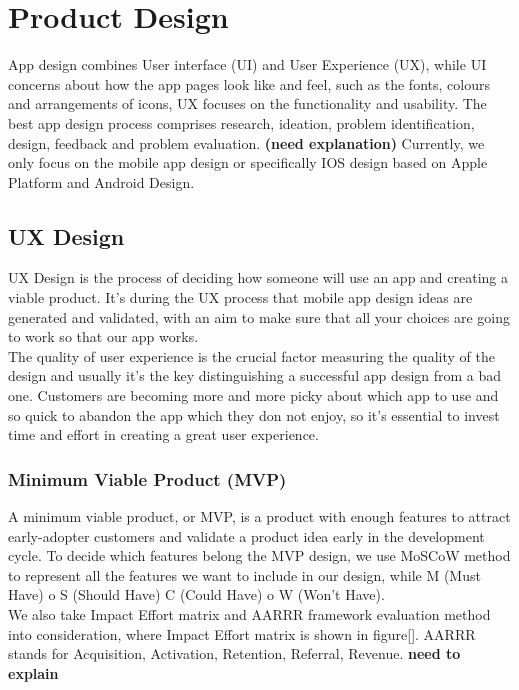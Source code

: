 
\chapter{Product Design} %

\label{Chapter2} %

App design combines User interface (UI) and User Experience (UX), while UI concerns about how the app pages look like and feel, such as the fonts, colours and arrangements of icons, UX focuses on the functionality and usability. The best app design process comprises research, ideation, problem identification, design, feedback and problem evaluation. \textbf{(need explanation)} Currently, we only focus on the mobile app design or specifically IOS design based on Apple Platform and Android Design. 

\section{UX Design}
UX Design is the process of deciding how someone will use an app and creating a viable product. It’s during the UX process that mobile app design ideas are generated and validated, with an aim to make sure that all your choices are going to work so that our app works. 
\\The quality of user experience is the crucial factor measuring the quality of the design and usually it's the key distinguishing a successful app design from a bad one. Customers are becoming more and more picky about which app to use and so quick to abandon the app which they don not enjoy, so it's essential to invest time and effort in creating a great user experience.
\subsection{Minimum Viable Product (MVP)}
A minimum viable product, or MVP, is a product with enough features to attract early-adopter customers and validate a product idea early in the development cycle. To decide which features belong the MVP design, we use MoSCoW method to represent all the features we want to include in our design, while M (Must Have) o S (Should Have) C (Could Have) o W (Won’t Have). 
\\We also take Impact Effort matrix and AARRR framework evaluation method into consideration, where Impact Effort matrix is shown in figure[]. AARRR stands for Acquisition, Activation, Retention, Referral, Revenue. \textbf{need to explain}

